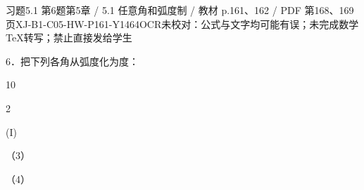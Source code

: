 \begin{bankitem}{习题5.1 第6题}{第5章 / 5.1 任意角和弧度制 / 教材 p.161、162 / PDF 第168、169页}{XJ-B1-C05-HW-P161-Y1464}{OCR未校对：公式与文字均可能有误；未完成数学TeX转写；禁止直接发给学生}
\begin{ocrdraft}
\par
6．把下列各角从弧度化为度：
\par
10
\par
2
\par
(I)
\par
（3）
\par
（4）
\par
[教材p.162 / PDF第169页]
\end{ocrdraft}
\end{bankitem}
